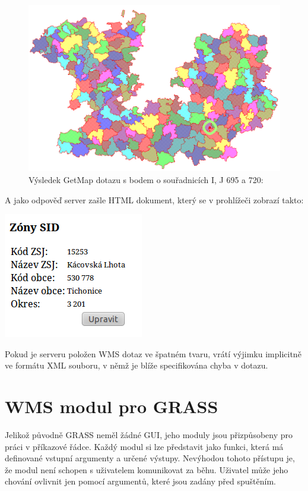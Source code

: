 \documentclass[a4paper,12pt]{article}
\begin{document}
  
\begin{figure}[h!]
 \includegraphics[scale=0.3]{figures/getfeatureinfo}
  \caption{Výsledek GetMap dotazu s bodem o souřadnicích I, J  695 a 720:}
\end{figure}

A jako odpověď server zašle HTML dokument, který se v prohlížeči
zobrazí takto:

 \includegraphics[scale=0.7]{figures/getfeatureinforeply}


Pokud je serveru položen WMS dotaz ve špatném tvaru, vrátí výjimku
implicitně ve formátu XML souboru, v němž je blíže specifikována chyba
v dotazu.


\newpage

\section{WMS modul pro GRASS}

Jelikož původně GRASS neměl žádné GUI, jeho moduly jsou přizpůsobeny
pro práci v příkazové řádce. Každý modul si lze představit jako
funkci, která má definované vstupní argumenty a určené
výstupy. Nevýhodou tohoto přístupu je, že modul není schopen s
uživatelem komunikovat za běhu. Uživatel může jeho chování ovlivnit
jen pomocí argumentů, které jsou zadány před spuštěním.
\end{document}
